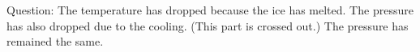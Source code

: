 Question: The temperature has dropped because the ice has melted.
The pressure has also dropped due to the cooling. (This part is crossed out.)
The pressure has remained the same.